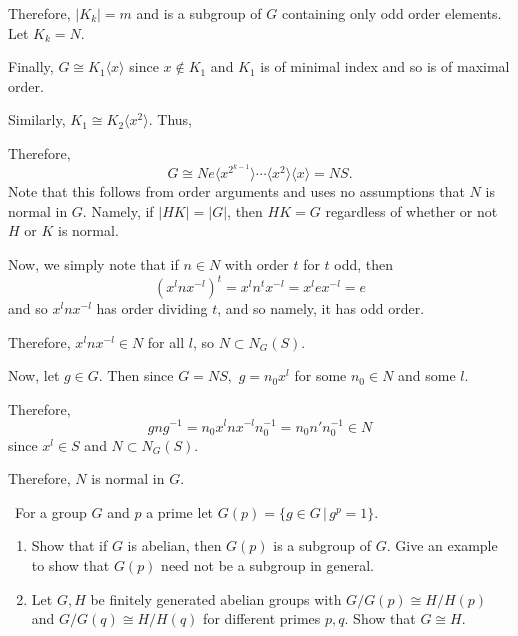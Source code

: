 \documentclass[12pt]{Qual}
\begin{document}
\begin{solution}
\begin{enumerate}[label=(\alph*)]
    Therefore, $|K_k|=m$ and is a subgroup of $G$ containing only odd order elements. Let $K_k=N.$

    Finally, $G\cong K_1\langle x\rangle$ since $x\notin K_1$ and $K_1$ is of minimal index and so is of maximal order.

    Similarly, $K_1\cong K_2\langle x^2\rangle$. Thus,

    Therefore, $$G\cong Ne\langle x^{2^{k-1}}\rangle\cdots\langle x^2\rangle\langle x\rangle=NS.$$ Note that this follows from order arguments and uses no assumptions that $N$ is normal in $G.$ Namely, if $|HK|=|G|$, then $HK=G$ regardless of whether or not $H$ or $K$ is normal.

    Now, we simply note that if $n\in N$ with order $t$ for $t$ odd, then $$(x^lnx^{-l})^t=x^ln^tx^{-l}=x^lex^{-l}=e$$ and so $x^lnx^{-l}$ has order dividing $t$, and so namely, it has odd order.

    Therefore, $x^lnx^{-l}\in N$ for all $l$, so $N\subset N_G(S).$

    Now, let $g\in G.$ Then since $G=NS,$ $g=n_0x^l$ for some $n_0\in N$ and some $l.$

    Therefore, $$gng^{-1}=n_0x^lnx^{-l}n_0^{-1}=n_0n'n_0^{-1}\in N$$ since $x^l\in S$ and $N\subset N_G(S).$

    Therefore, $N$ is normal in $G.$
\end{enumerate}
\end{solution}
\newpage

\begin{problem} $\,$
For a group $G$ and $p$ a prime let $G(p)=\{g\in G\,|\,g^p=1\}.$
\begin{enumerate}[label=(\alph*)]
    \item Show that if $G$ is abelian, then $G(p)$ is a subgroup of $G.$ Give an example to show that $G(p)$ need not be a subgroup in general.
    \item Let $G,H$ be finitely generated abelian groups with $G/G(p)\cong H/H(p)$ and $G/G(q)\cong H/H(q)$ for different primes $p,q$. Show that $G\cong H.$
\end{enumerate}
\end{problem}
\end{document}
